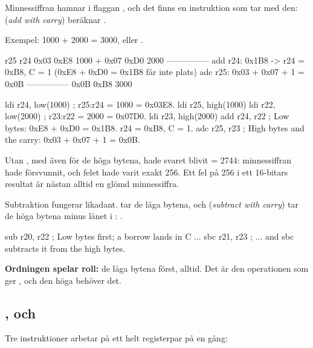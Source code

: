 Minnessiffran hamnar i flaggan , och det finns en instruktion som tar med den:
\textbf{} (\emph{add with carry}) beräknar .

Exempel: 1000 + 2000 = 3000, eller .

\begin{textdrawing}
                 r25    r24
                0x03   0xE8      1000
             +  0x07   0xD0      2000
             ---------------
  add r24:             0x1B8  -> r24 = 0xB8, C = 1
                                 (0xE8 + 0xD0 = 0x1B8 får inte plats)
  adc r25:     0x03 + 0x07 + 1 = 0x0B
             ---------------
                0x0B   0xB8      3000
\end{textdrawing}

\begin{asmcode}
    ldi r24, low(1000)              ; r25:r24 = 1000 = 0x03E8.
    ldi r25, high(1000)
    ldi r22, low(2000)              ; r23:r22 = 2000 = 0x07D0.
    ldi r23, high(2000)
    add r24, r22                    ; Low bytes: 0xE8 + 0xD0 = 0x1B8. r24 = 0xB8, C = 1.
    adc r25, r23                    ; High bytes and the carry: 0x03 + 0x07 + 1 = 0x0B.
\end{asmcode}

\noindent Utan , med  även för de höga bytena, hade svaret blivit 
= 2744: minnessiffran hade försvunnit, och felet hade varit exakt 256. Ett fel på 256 i ett
16-bitars resultat är nästan alltid en glömd minnessiffra.

Subtraktion fungerar likadant. \textbf{} tar de låga bytena, och \textbf{}
(\emph{subtract with carry}) tar de höga bytena minus lånet i : .

\begin{asmcode}
    sub r20, r22                    ; Low bytes first; a borrow lands in C ...
    sbc r21, r23                    ; ... and sbc subtracts it from the high bytes.
\end{asmcode}

\noindent\textbf{Ordningen spelar roll:} de låga bytena först, alltid. Det är den operationen som
ger , och den höga behöver det.

\subsection{,  och }
\label{c10:a8}
Tre instruktioner arbetar på ett helt registerpar på en gång:

